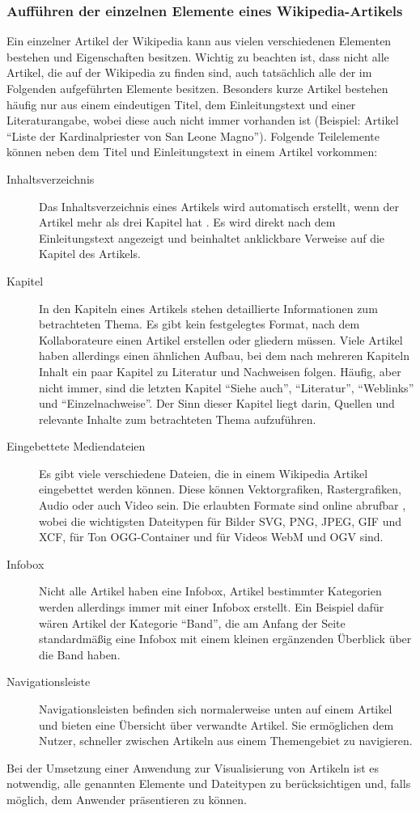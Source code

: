 \documentclass[12pt, a4paper]{article}
\begin{document}
\subsubsection{Aufführen der einzelnen Elemente eines Wikipedia-Artikels}
Ein einzelner Artikel der Wikipedia kann aus vielen verschiedenen Elementen bestehen und Eigenschaften besitzen. Wichtig zu beachten ist, dass nicht alle Artikel, die auf der Wikipedia zu finden sind, auch tatsächlich alle der im Folgenden aufgeführten Elemente besitzen. Besonders kurze Artikel bestehen häufig nur aus einem eindeutigen Titel, dem Einleitungstext und einer Literaturangabe, wobei diese auch nicht immer vorhanden ist (Beispiel: Artikel "`Liste der Kardinalpriester von San Leone Magno"'). Folgende Teilelemente können neben dem Titel und Einleitungstext in einem Artikel vorkommen:
\begin{description}
\item[Inhaltsverzeichnis] Das Inhaltsverzeichnis eines Artikels wird automatisch erstellt, wenn der Artikel mehr als drei Kapitel hat \protect\cite{wiki:03}. Es wird direkt nach dem Einleitungstext angezeigt und beinhaltet anklickbare Verweise auf die Kapitel des Artikels.
\item[Kapitel] In den Kapiteln eines Artikels stehen detaillierte Informationen zum betrachteten Thema. Es gibt kein festgelegtes Format, nach dem Kollaborateure einen Artikel erstellen oder gliedern müssen. Viele Artikel haben allerdings einen ähnlichen Aufbau, bei dem nach mehreren Kapiteln Inhalt ein paar Kapitel zu Literatur und Nachweisen folgen. Häufig, aber nicht immer, sind die letzten Kapitel "`Siehe auch"', "`Literatur"', "`Weblinks"' und "`Einzelnachweise"'. Der Sinn dieser Kapitel liegt darin, Quellen und relevante Inhalte zum betrachteten Thema aufzuführen.
\item[Eingebettete Mediendateien] Es gibt viele verschiedene Dateien, die in einem Wikipedia Artikel eingebettet werden können. Diese können Vektorgrafiken, Rastergrafiken, Audio oder auch Video sein. Die erlaubten Formate sind online abrufbar \cite{wiki:04}, wobei die wichtigsten Dateitypen für Bilder SVG, PNG, JPEG, GIF und XCF, für Ton OGG-Container und für Videos WebM und OGV sind.
\item[Infobox] Nicht alle Artikel haben eine Infobox, Artikel bestimmter Kategorien werden allerdings immer mit einer Infobox erstellt. Ein Beispiel dafür wären Artikel der Kategorie "`Band"', die am Anfang der Seite standardmäßig eine Infobox mit einem kleinen ergänzenden Überblick über die Band haben. 
\item[Navigationsleiste] Navigationsleisten befinden sich normalerweise unten auf einem Artikel und bieten eine Übersicht über verwandte Artikel. Sie ermöglichen dem Nutzer, schneller zwischen Artikeln aus einem Themengebiet zu navigieren.
\end{description}
Bei der Umsetzung einer Anwendung zur Visualisierung von Artikeln ist es notwendig, alle genannten Elemente und Dateitypen zu berücksichtigen und, falls möglich, dem Anwender präsentieren zu können.\\
\end{document}
